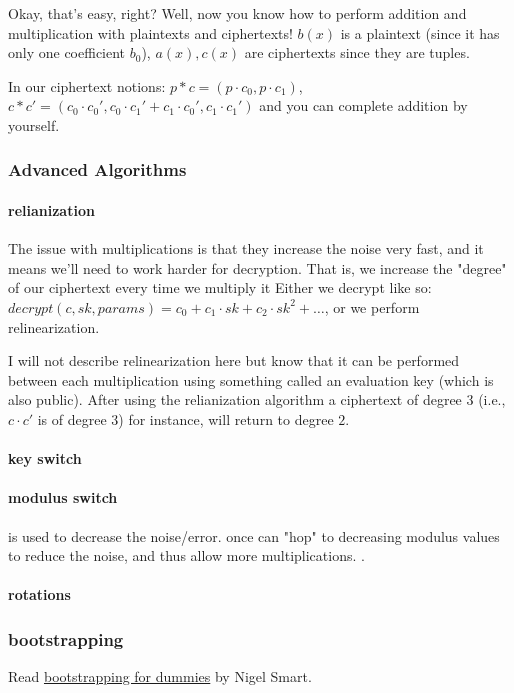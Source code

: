 Okay, that's easy, right? Well, now you know how to perform addition and multiplication with plaintexts and ciphertexts!
$b(x)$ is a plaintext (since it has only one coefficient $b_0$), $a(x),c(x)$ are ciphertexts
since they are tuples.

In our ciphertext notions:
$p*c=(p\cdot c_0, p\cdot c_1)$,
$c*c'=(c_0\cdot c_0', c_0\cdot c_1' + c_1\cdot c_0', c_1\cdot c_1')$ and you can complete addition by yourself.

\subsubsection{Advanced Algorithms}
\paragraph{relianization}
The issue with multiplications is that they increase the noise very fast, and it means we'll need to work harder 
for decryption. That is, we increase the "degree" of our ciphertext every time we multiply it
Either we decrypt like so: $decrypt(c, sk, params)= c_0 +c_1\cdot sk+c_2\cdot sk^2+\dots$, 
or we perform relinearization.

I will not describe relinearization here but know that it can be performed between each multiplication
using something called an evaluation key (which is also public). After using the relianization algorithm 
a ciphertext of degree $3$ (i.e., $c\cdot c'$ is of degree $3$) for instance, will return to degree $2$.

\paragraph{key switch}
\paragraph{modulus switch}
is used to decrease the noise/error. once can "hop" to decreasing modulus values to reduce the noise, and thus allow 
more multiplications. .

\paragraph{rotations}
\subsubsection{bootstrapping}
Read \href{https://www.zama.ai/post/what-is-bootstrapping-homomorphic-encryption}{bootstrapping for dummies} by Nigel Smart.

